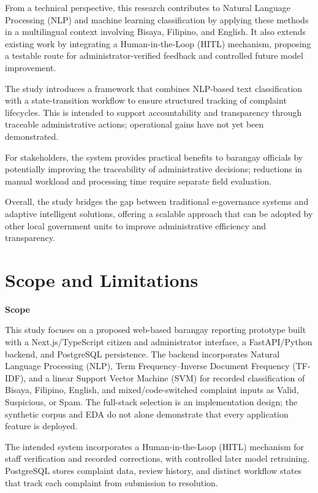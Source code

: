 From a technical perspective, this research contributes to Natural Language Processing (NLP) and machine learning classification by applying these methods in a multilingual context involving Bisaya, Filipino, and English. It also extends existing work by integrating a Human-in-the-Loop (HITL) mechanism, proposing a testable route for administrator-verified feedback and controlled future model improvement.

The study introduces a framework that combines NLP-based text classification with a state-transition workflow to ensure structured tracking of complaint lifecycles. This is intended to support accountability and transparency through traceable administrative actions; operational gains have not yet been demonstrated.

For stakeholders, the system provides practical benefits to barangay officials by potentially improving the traceability of administrative decisions; reductions in manual workload and processing time require separate field evaluation.

Overall, the study bridges the gap between traditional e-governance systems and adaptive intelligent solutions, offering a scalable approach that can be adopted by other local government units to improve administrative efficiency and transparency.

\section{Scope and Limitations}
\textbf{Scope}

This study focuses on a proposed web-based barangay reporting prototype built with a Next.js/TypeScript citizen and administrator interface, a FastAPI/Python backend, and PostgreSQL persistence. The backend incorporates Natural Language Processing (NLP), Term Frequency--Inverse Document Frequency (TF-IDF), and a linear Support Vector Machine (SVM) for recorded classification of Bisaya, Filipino, English, and mixed/code-switched complaint inputs as Valid, Suspicious, or Spam. The full-stack selection is an implementation design; the synthetic corpus and EDA do not alone demonstrate that every application feature is deployed.

The intended system incorporates a Human-in-the-Loop (HITL) mechanism for staff verification and recorded corrections, with controlled later model retraining. PostgreSQL stores complaint data, review history, and distinct workflow states that track each complaint from submission to resolution.

